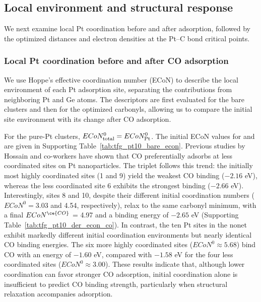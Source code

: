 \subsection{Local environment and structural response}

We next examine local Pt coordination before and after
 adsorption, followed by the optimized  distances and
electron densities at the Pt--C bond critical points.

\subsubsection{Local Pt coordination before and after CO adsorption}
\label{subsec:local_pt_coordination}

We use Hoppe's effective coordination number (ECoN) to describe the
local environment of each Pt adsorption site, separating the contributions
from neighboring Pt and Ge atoms. The descriptors are first evaluated for the
bare clusters and then for the optimized carbonyls, allowing us to compare the
initial site environment with its change after CO adsorption.

For the pure-Pt clusters, $ECoN_{\rm total}^{0}=ECoN_{\rm Pt}^{0}$.
The initial ECoN values for  and  are given in
Supporting Table~\ref{tab:tfg_pt10_bare_econ}.
Previous studies by Hossain and co-workers have shown that CO preferentially adsorbs at less coordinated sites on Pt nanoparticles\cite{hossain:lowcoord:2020}. The triplet  follows this trend: the initially most highly coordinated sites (1 and 9) yield the weakest CO binding ($-2.16$ eV), whereas the less coordinated site 6 exhibits the strongest binding ($-2.66$ eV). Interestingly, sites 8 and 10, despite their different initial coordination numbers ($ECoN^{0}=3.03$ and 4.54, respectively), relax to the same carbonyl minimum, with a final $ECoN^{\ce{CO}}$ = 4.97 and a binding energy of $-2.65$ eV (Supporting Table~\ref{tab:tfg_pt10_der_econ_co}). In contrast, the ten Pt sites in the nonet  exhibit markedly different initial coordination environments but nearly identical CO binding energies. The six more highly coordinated sites ($ECoN^{0}\approx5.68$) bind CO with an energy of $-1.60$ eV, compared with $-1.58$ eV for the four less coordinated sites ($ECoN^{0}\approx3.00$). These results indicate that, although lower coordination can favor stronger CO adsorption, initial coordination alone is insufficient to predict CO binding strength, particularly when structural relaxation accompanies adsorption.


